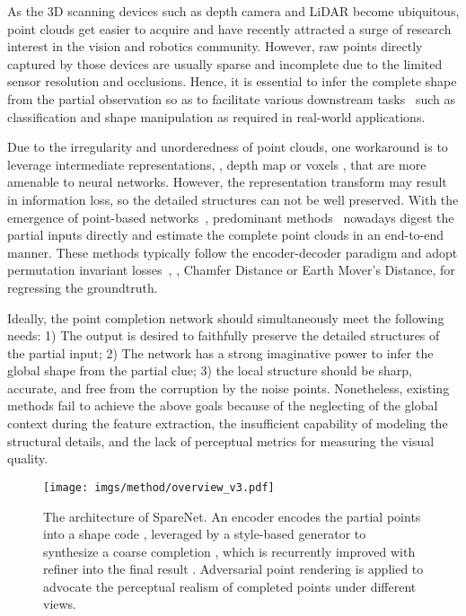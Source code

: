 \documentclass[final]{cvpr}
\begin{document}
As the 3D scanning devices such as depth camera and LiDAR become ubiquitous, point clouds get easier to acquire and have recently attracted a surge of research interest in the vision and robotics community. 
However, raw points directly captured by those devices are usually sparse and incomplete due to the limited sensor resolution and occlusions. Hence, it is essential to infer the complete shape from the partial observation so as to facilitate various downstream tasks~\cite{guo2020deep} such as classification and shape manipulation as required in real-world applications.

Due to the irregularity and unorderedness of point clouds, one workaround is to leverage intermediate representations, \eg, depth map \cite{hu2019render4completion} or voxels \cite{xie2020grnet}, that are more amenable to neural networks. However, the representation transform may result in information loss, so the detailed structures can not be well preserved. With the emergence of point-based networks~\cite{qi2017pointnet,qi2017pointnet++,thomas2019kpconv,dgcnn,guo2020deep}, predominant methods~\cite{foldingnet_2018_CVPR,Yuan-2018-pcn,atlasnet2018,wen2020point,liu2019morphing,topnet_2019_CVPR,chen2019unpaired,cascaded_2020_CVPR, pfnet_2020_CVPR, detailpreserved_eccv2020} nowadays digest the partial inputs directly and estimate the complete point clouds in an end-to-end manner. These methods typically follow the encoder-decoder paradigm and adopt permutation invariant losses~\cite{fan2017pointsetgeneration}, \eg, Chamfer Distance or Earth Mover's Distance, for regressing the groundtruth. 

Ideally, the point completion network should simultaneously meet the following needs: 1) The output is desired to faithfully preserve the detailed structures of the partial input; 2) The network has a strong imaginative power to infer the global shape from the partial clue; 3) the local structure should be sharp, accurate, and free from the corruption by the noise points. Nonetheless, existing methods fail to achieve the above goals because of the neglecting of the global context during the feature extraction, the insufficient capability of modeling the structural details, and the lack of perceptual metrics for measuring the visual quality. 


\begin{figure*}[t]
\centering
 \texttt{[image: imgs/method/overview\_v3.pdf]}
 \footnotesize
    \caption{
    The architecture of SpareNet. An encoder  encodes the partial points  into a shape code , leveraged by a style-based generator  to synthesize a coarse completion , which is recurrently improved with refiner  into the final result . Adversarial point rendering is applied to advocate the perceptual realism of completed points under different views.
    }
\label{fig:overview}
\vspace{-1em}
\end{figure*}
\end{document}
